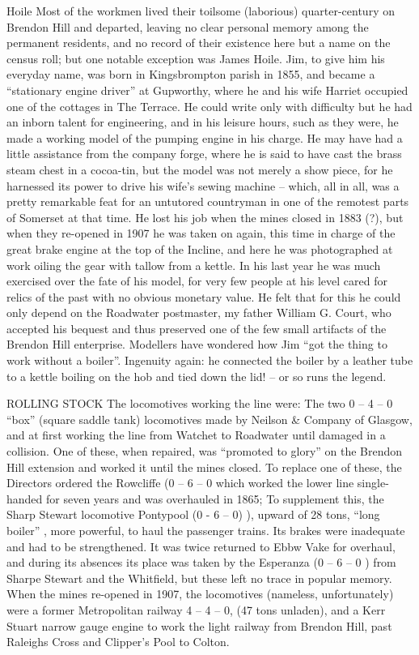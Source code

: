 \documentclass[11pt]{book}
\begin{document}
 Hoile
      Most of the workmen lived their toilsome (laborious) quarter-century on Brendon Hill and departed, leaving no clear personal memory among the permanent residents, and no record of their existence here but a name on the census roll; but one notable exception was James Hoile.
  Jim, to give him his everyday name, was born in Kingsbrompton parish in 1855, and became a “stationary engine driver” at Gupworthy, where he and his wife Harriet occupied one of the cottages in The Terrace. He could write only with difficulty but he had an inborn talent for engineering, and in his leisure hours, such as they were, he made a working model of the pumping engine in his charge. He may have had a little assistance from the company forge, where he is said to have cast the brass steam chest in a cocoa-tin, but the model was not merely a show piece, for he harnessed its power to drive his wife’s sewing machine – which, all in all, was a pretty remarkable feat for an untutored countryman in one of the remotest parts of Somerset at that time. He lost his job when the mines closed in 1883 (?), but when they re-opened in 1907 he was taken on again, this time in charge of the great brake engine at the top of the Incline, and here he was photographed at work oiling the gear with tallow from a kettle. 
  In his last year he was much exercised over the fate of his model, for very few people at his level cared for relics of the past with no obvious monetary value. He felt that for this he could only depend on the Roadwater postmaster, my father William G. Court, who accepted his bequest and thus preserved one of the few small artifacts of the Brendon Hill enterprise.
  Modellers have wondered how Jim “got the thing to work without a boiler”. Ingenuity again: he connected the boiler by a leather tube to a kettle boiling on the hob and tied down the lid! – or so runs the legend.    
     
ROLLING STOCK
The locomotives working the line were:
The two  0 – 4 – 0 “box” (square saddle tank) locomotives made by Neilson \& Company of Glasgow, and at first working the line from Watchet to Roadwater until damaged in a collision. One of these, when repaired, was “promoted to glory” on the Brendon Hill extension and worked it until the mines closed. 
    To replace one of these, the Directors ordered the Rowcliffe (0 – 6 – 0 which worked the lower line single-handed for seven years and was overhauled in 1865; 
   To supplement this, the Sharp Stewart locomotive Pontypool (0 - 6 – 0) ), upward of 28 tons,  “long boiler” , more powerful, to haul the passenger trains. Its brakes were inadequate and had to be strengthened.  It was twice returned to Ebbw Vake for overhaul, and during its absences its place was taken by the
	Esperanza (0 – 6 – 0 ) from Sharpe Stewart and the
            Whitfield, but these left no trace in popular memory.
  When the mines re-opened in 1907, the locomotives (nameless, unfortunately) were a former Metropolitan railway 4 – 4 – 0, (47 tons unladen), and a 
   Kerr Stuart narrow gauge engine to work the light railway from Brendon Hill, past Raleighs Cross and Clipper’s Pool to Colton.  
\end{document}
